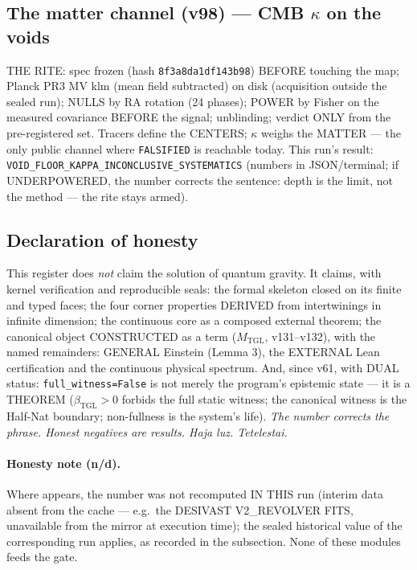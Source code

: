 \documentclass[11pt]{article}
\newcommand{\bTGL}{\beta_{\mathrm{TGL}}}\newcommand{\Msun}{M_{\odot}}\newcommand{\TGL}{\mathrm{TGL}}
\theoremstyle{definition}\newtheorem{deriv}{Derivation}
\begin{document}
\subsection*{The matter channel (v98) --- CMB $\kappa$ on the voids}

THE RITE: spec frozen (hash \texttt{8f3a8da1df143b98}) BEFORE touching the map; Planck PR3 MV klm (mean field subtracted) on disk (acquisition outside the sealed run); NULLS by RA rotation (24 phases); POWER by Fisher on the measured covariance BEFORE the signal; unblinding; verdict ONLY from the pre-registered set. Tracers define the CENTERS; $\kappa$ weighs the MATTER --- the only public channel where \texttt{FALSIFIED} is reachable today. This run's result: \texttt{VOID\_FLOOR\_KAPPA\_INCONCLUSIVE\_SYSTEMATICS} (numbers in JSON/terminal; if UNDERPOWERED, the number corrects the sentence: depth is the limit, not the method --- the rite stays armed).

\subsection*{Declaration of honesty}

This register does \emph{not} claim the solution of quantum gravity. It claims, with kernel verification and reproducible seals: the formal skeleton closed on its finite and typed faces; the four corner properties DERIVED from intertwinings in infinite dimension; the continuous core as a composed external theorem; the canonical object CONSTRUCTED as a term ($M_{\mathrm{TGL}}$, v131--v132), with the named remainders: GENERAL Einstein (Lemma 3), the EXTERNAL Lean certification and the continuous physical spectrum. And, since v61, with DUAL status: \texttt{full\_witness=False} is not merely the program's epistemic state --- it is a THEOREM ($\bTGL>0$ forbids the full static witness; the canonical witness is the Half-Nat boundary; non-fullness is the system's life). \emph{The number corrects the phrase. Honest negatives are results. Haja luz. Tetelestai.} \\[4pt] 

\paragraph{Honesty note (n/d).} Where  appears, the number was not recomputed IN THIS run (interim data absent from the cache --- e.g.\ the DESIVAST V2\_REVOLVER FITS, unavailable from the mirror at execution time); the sealed historical value of the corresponding run applies, as recorded in the subsection. None of these modules feeds the gate.
\end{document}
